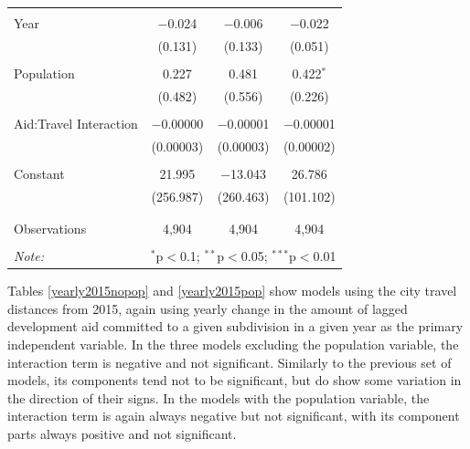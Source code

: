 \documentclass[12pt, letterpaper]{article}
\begin{document}
\begin{table}[!htbp]
\begin{tabular}{@{\extracolsep{5pt}}lccc}
		& & & \\ 
		Year & $-$0.024 & $-$0.006 & $-$0.022 \\ 
		& (0.131) & (0.133) & (0.051) \\ 
		& & & \\ 
		Population & 0.227 & 0.481 & 0.422$^{*}$ \\ 
		& (0.482) & (0.556) & (0.226) \\ 
		& & & \\ 
		Aid:Travel Interaction & $-$0.00000 & $-$0.00001 & $-$0.00001 \\ 
		& (0.00003) & (0.00003) & (0.00002) \\ 
		& & & \\ 
		Constant & 21.995 & $-$13.043 & 26.786 \\ 
		& (256.987) & (260.463) & (101.102) \\ 
		& & & \\ 
		\hline \\[-1.8ex] 
		Observations & 4,904 & 4,904 & 4,904 \\ 
		\hline 
		\hline \\[-1.8ex] 
		\textit{Note:}  & \multicolumn{3}{r}{$^{*}$p$<$0.1; $^{**}$p$<$0.05; $^{***}$p$<$0.01} \\ 
	\end{tabular} 
	\label{yearly2000pop}
\end{table}

\newpage

Tables \ref{yearly2015nopop} and \ref{yearly2015pop} show models using the city travel distances from 2015, again using yearly change in the amount of lagged development aid committed to a given subdivision in a given year as the primary independent variable. In the three models excluding the population variable, the interaction term is negative and not significant. Similarly to the previous set of models, its components tend not to be significant, but do show some variation in the direction of their signs. In the models with the population variable, the interaction term is again always negative but not significant, with its component parts always positive and not significant. 
\end{document}
